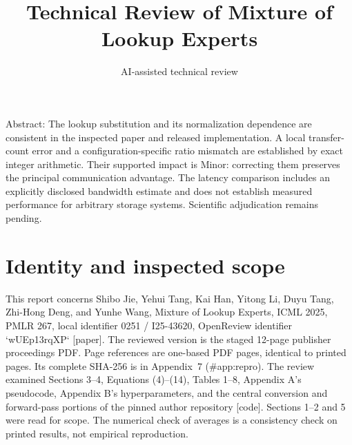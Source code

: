 \documentclass[10pt]{article}
\title{Technical Review of
Mixture of Lookup Experts}
\author{AI-assisted technical review}
\date{}
\begin{document}
\maketitle
Abstract: The lookup substitution and its normalization dependence are consistent in the inspected paper and released implementation. A local transfer-count error and a configuration-specific ratio mismatch are established by exact integer arithmetic. Their supported impact is Minor: correcting them preserves the principal communication advantage. The latency comparison includes an explicitly disclosed bandwidth estimate and does not establish measured performance for arbitrary storage systems. Scientific adjudication remains pending.\par
\section*{Identity and inspected scope}
This report concerns Shibo Jie, Yehui Tang, Kai Han, Yitong Li, Duyu Tang, Zhi-Hong Deng, and Yunhe Wang, Mixture of Lookup Experts, ICML 2025, PMLR 267, local identifier 0251 / I25-43620, OpenReview identifier `wUEp13rqXP` [paper]. The reviewed version is the staged 12-page publisher proceedings PDF. Page references are one-based PDF pages, identical to printed pages. Its complete SHA-256 is in Appendix 7 (\#app:repro). The review examined Sections 3–4, Equations (4)–(14), Tables 1–8, Appendix A’s pseudocode, Appendix B’s hyperparameters, and the central conversion and forward-pass portions of the pinned author repository [code]. Sections 1–2 and 5 were read for scope. The numerical check of averages is a consistency check on printed results, not empirical reproduction.\par
\end{document}
